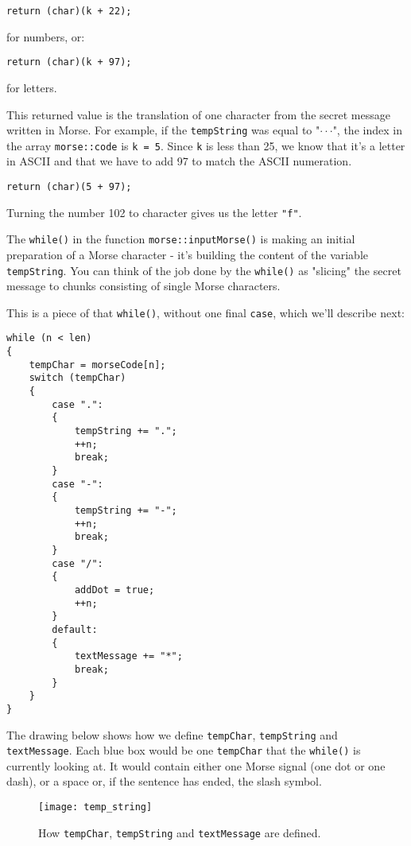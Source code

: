\documentclass[12pt]{report}
\begin{document}
\begin{lstlisting}
return (char)(k + 22);
\end{lstlisting}

for numbers, or:

\begin{lstlisting}
return (char)(k + 97);
\end{lstlisting}

for letters.

This returned value is the translation of one character from the secret message written in Morse. For example, if the \verb|tempString| was equal to "$\cdot\cdot$\text{-}$\cdot$", the index in the array \verb|morse::code| is \verb|k = 5|. Since \verb|k| is less than 25, we know that it's a letter in ASCII and that we have to add 97 to match the ASCII numeration. 

\begin{lstlisting}
return (char)(5 + 97);
\end{lstlisting}

Turning the number 102 to character gives us the letter \verb|"f"|.

The \verb|while()| in the function  \verb|morse::inputMorse()| is making an initial preparation of a Morse character - it's building the content of the variable \verb|tempString|. You can think of the job done by the \verb|while()| as "slicing" the secret message to chunks consisting of single Morse characters.

This is a piece of that \verb|while()|, without one final \verb|case|, which we'll describe next:

\begin{lstlisting}
while (n < len)
{
	tempChar = morseCode[n];
	switch (tempChar)
	{
		case ".":
		{
			tempString += ".";
			++n;
			break;
		}
		case "-":
		{
			tempString += "-";
			++n;
			break;
		}
		case "/":
		{
			addDot = true;
			++n;
		}
		default:
		{
			textMessage += "*";
			break;
		}
	}
}
\end{lstlisting}

The drawing below shows how we define \verb|tempChar|, \verb|tempString| and \verb|textMessage|. Each blue box would be one \verb|tempChar| that the \verb|while()| is currently looking at. It would contain either one Morse signal (one dot or one dash), or a space or, if the sentence has ended, the slash symbol.

\begin{figure}[H]
\centering\texttt{[image: temp\_string]}
\caption{How \texttt{tempChar}, \texttt{tempString} and \texttt{textMessage} are defined.}
\label{fig:temp_char}
\end{figure}
\end{document}
